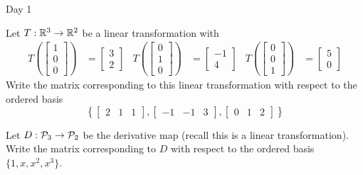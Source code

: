 \documentclass{article}[12pt]
\begin{document}
\begin{applicationActivities}{Day 1}
\begin{activity}
  Let $T: \IR^3 \rightarrow \IR^2$ be a linear transformation with
\begin{align*}
T\left(\begin{bmatrix} 1 \\ 0 \\ 0 \end{bmatrix} \right) &= \begin{bmatrix} 3 \\ 2\end{bmatrix} &
T\left(\begin{bmatrix} 0 \\ 1 \\ 0 \end{bmatrix} \right) &= \begin{bmatrix} -1 \\ 4\end{bmatrix} &
T\left(\begin{bmatrix} 0 \\ 0 \\ 1 \end{bmatrix} \right) &= \begin{bmatrix} 5 \\ 0\end{bmatrix}
\end{align*}
Write the matrix corresponding to this linear transformation with respect to the ordered basis
\[\left\{ \begin{bmatrix} 2 & 1 & 1 \end{bmatrix} , \begin{bmatrix} -1 & -1 & 3 \end{bmatrix} , \begin{bmatrix} 0 & 1 & 2 \end{bmatrix} \right\}\]
\end{activity}

\begin{activity}
Let $D: \P_3 \rightarrow \P_2$ be the derivative map (recall this is a linear transformation).  Write the matrix corresponding to $D$ with respect to the ordered basis $\{1,x,x^2,x^3\}$.
\end{activity}

\end{applicationActivities}
\end{document}
